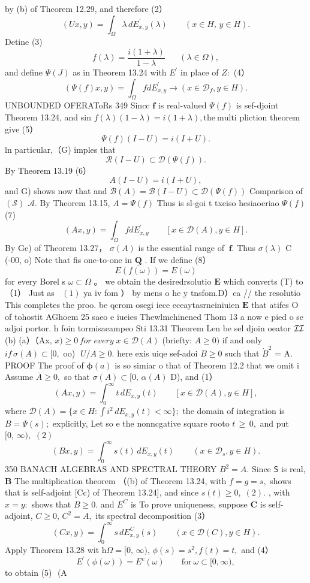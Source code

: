 by (b) of Thcorem 12.29, and therefore (2） $$ (U x,y)=\int_{\Omega}\lambda\,d E_{x,y}^{\prime}(\lambda)\qquad(x\in H,\,y\in H). $$ Detine (3) $$ f(\lambda)=\frac{i(1+\lambda)}{1-\lambda}\;\;\;\;\;\;(\lambda\in\Omega), $$ and define $\Psi(J)$ as in Theorem 13.24 with $E^{\prime}$ in place of $\textstyle Z\colon$ (4） $$ (\Psi(f)x,y)=\int_{\Omega}f d E_{x,y}^{\prime}\longrightarrow(x\in{\mathcal{D}}_{f},y\in H). $$UNBOUNDED OFERAToRs 349 Sincc $\boldsymbol{f}$ is real-valued $\Psi(f)$ is sef-djoint Theorem 13.24, and sin $f(\lambda)(1-\lambda)=i(1+\lambda),\mathrm{the~multi}$ pliction theorem give (5） $$ \Psi(f)(I-U)=i(I+U). $$ ln particular,（G) imples that $$ \mathcal{R}(I-U)\subset\mathcal{D}(\Psi(f)). $$ By Theorem 13.19 (6） $$ A(I-U)=i(I+U), $$ and G) shows now that and $\mathcal{B}(A)=\mathcal{B}(I-U)\subset\mathcal{D}(\Psi(f))$ Comparison of $({\mathcal{S}})$ ${\mathcal{A}}.$ By Theorem 13.15, $A=\Psi(f)$ Thus is sl-goi t txeiso hesiaoeriao $\Psi(f)$ (7) $$ (A x,y)=\int_{\Omega}f d E_{x,y}^{\prime}\qquad[x\in{\mathcal D}(A),y\in H]. $$ By Ge) of Theorem 13.27， $\sigma(A)$ is the essential range of ${\boldsymbol{\ f}}.$ Thus $\sigma(\lambda)$ C (-00, o) Note that fis one-to-one in $\underline{{\mathbf{Q}}}$ . If we define (8） $$ E(f(\omega))=E(\omega) $$ for every Borel s $\omega\subset\Omega$ 。 we obtain the desiredrsolutio ${\boldsymbol{E}}$ which converts (T) to （1） Just as $\operatorname{\mathcal{}}(1)$ ya iv fom ） by mens o he y tnsfom.D）ca // the resolutio This completes the proo. be qcrom osegi iece eceaytasrneiniuien $\boldsymbol{E}$ that atifes O of tohostit AGhoem 25 saeo e iueies Thewlmchinened Thom 13 a now e pied o se adjoi portor. h foin tormisaeampeo Sti 13.31 Theorem Len be sel djoin oeator ${\cal{I}}{\cal{I}}$ (b) (a）（Ax, $x)\geq0\,f o r\;e v e r y\;x\in\mathcal{D}(A)$ (briefty: $A\geq0)$ if and only $i f\,\sigma(A)\subset[0,$ oo) $\;U/A\geq0.$ here exis uiqe sef-adoi $\scriptstyle B\geq0$ such that ${\dot{B}}^{2}$ = A. PROOF The proof of $\mathbf{\phi}(a)$ is so simiar o that of Theorem 12.2 that we omit i Assume ${\bar{A}}\geq0,$ so that $\sigma(A)\subset[0,\,\alpha(A)$ D), and (1） $$ (A x,y)=\int_{0}^{\infty}t\,d E_{x,y}(t)\qquad[x\in{\mathcal{D}}(A),y\in H], $$ where ${\mathcal D}(A)=\{x\in H:\int i^{2}\,d E_{x,y}(t)<\infty\};$ the domain of integration is $B=\Psi(s);$ explicitly, Let so e the nonncgative square rooto $\scriptstyle t\,\geq\,0,$ and put $[0,\,\infty),$ $\left(2\right)$ $$ (B x,y)=\int_{0}^{\infty}s(t)\,d E_{x,y}(t)\,\qquad(x\in\mathcal{D}_{s},y\in H). $$350 BANACH ALGEBRAS AND SPECTRAL THEORY $B^{2}=A.$ Since $\boldsymbol{\mathsf{S}}$ is real, $\boldsymbol{B}$ The multiplication theorem （(b) of Theorem 13.24, with $f=g=s,$ shows that is self-adjoint [Cc) of Theorem 13.24], and since $s(t)\geq0,\;(2).$ , with $x=y\colon$ shows that $\scriptstyle B\geq0.$ and $E^{C}$ is To prove uniqueness, suppose ${\boldsymbol{C}}$ is self-adjoint, $C\geq0,\,C^{2}=A,$ its spectral decomposition (3） $$ (C x,y)=\int_{0}^{\infty}\!s\,d E_{x,y}^{C}(s)\qquad(x\in\mathcal{D}(C),y\in H). $$ Apply Theorem 13.28 wit $\textrm{h}\Omega=[0,\,\infty),\,\phi(s)=s^{2},f(t)=t,$ and (4） $$ E^{\prime}(\phi(\omega))=E^{c}(\omega)\qquad{\mathrm{for~}}\omega\subset[0,\infty), $$ to obtain (5) $$ (A 